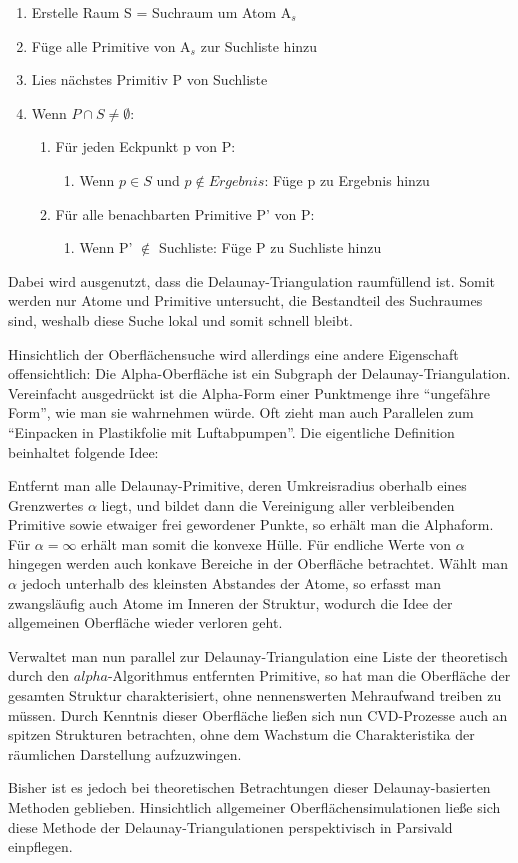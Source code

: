 \begin{enumerate}
\item Erstelle Raum S = Suchraum um Atom A$_s$
\item Füge alle Primitive von A$_s$ zur Suchliste hinzu
\item Lies nächstes Primitiv P von Suchliste
\item Wenn $P \cap S \neq \emptyset$:
  \begin{enumerate}
  \item Für jeden Eckpunkt p von P:
    \begin{enumerate}
    \item Wenn $p \in S$ und $p \notin Ergebnis$: Füge p zu Ergebnis hinzu
    \end{enumerate}
  \item Für alle benachbarten Primitive P' von P:
    \begin{enumerate}
    \item Wenn P' $\notin$ Suchliste: Füge P zu Suchliste hinzu
    \end{enumerate} 
  \end{enumerate}
\end{enumerate}

Dabei wird ausgenutzt, dass die Delaunay-Triangulation raumfüllend ist.
Somit werden nur Atome und Primitive untersucht, die Bestandteil des Suchraumes sind, weshalb diese Suche lokal und somit schnell bleibt.

Hinsichtlich der Oberflächensuche wird allerdings eine andere Eigenschaft offensichtlich:
Die Alpha-Oberfläche ist ein Subgraph der Delaunay-Triangulation.
Vereinfacht ausgedrückt ist die Alpha-Form einer Punktmenge ihre ``ungefähre Form'', wie man sie wahrnehmen würde.
Oft zieht man auch Parallelen zum ``Einpacken in Plastikfolie mit Luftabpumpen''.
Die eigentliche Definition beinhaltet folgende Idee:

Entfernt man alle Delaunay-Primitive, deren Umkreisradius oberhalb eines Grenzwertes $\alpha$ liegt, und bildet dann die Vereinigung aller verbleibenden Primitive sowie etwaiger frei gewordener Punkte, so erhält man die Alphaform.
Für $\alpha = \infty$ erhält man somit die konvexe Hülle.
Für endliche Werte von $\alpha$ hingegen werden auch konkave Bereiche in der Oberfläche betrachtet.
Wählt man $\alpha$ jedoch unterhalb des kleinsten Abstandes der Atome, so erfasst man zwangsläufig auch Atome im Inneren der Struktur, wodurch die Idee der allgemeinen Oberfläche wieder verloren geht.

Verwaltet man nun parallel zur Delaunay-Triangulation eine Liste der theoretisch durch den $alpha$-Algorithmus entfernten Primitive, so hat man die Oberfläche der gesamten Struktur charakterisiert, ohne nennenswerten Mehraufwand treiben zu müssen.
Durch Kenntnis dieser Oberfläche ließen sich nun CVD-Prozesse auch an spitzen Strukturen betrachten, ohne dem Wachstum die Charakteristika der räumlichen Darstellung aufzuzwingen.

Bisher ist es jedoch bei theoretischen Betrachtungen dieser Delaunay-basierten Methoden geblieben.
Hinsichtlich allgemeiner Oberflächensimulationen ließe sich diese Methode der Delaunay-Triangulationen perspektivisch in Parsivald einpflegen.
